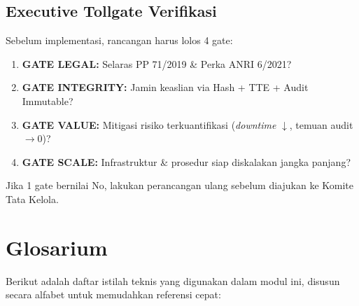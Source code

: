 \documentclass[12pt,a4paper]{report}
\begin{document}
\section{Executive Tollgate Verifikasi}
Sebelum implementasi, rancangan harus lolos 4 gate:
\begin{enumerate}[leftmargin=*]
    \item \textbf{GATE LEGAL:} Selaras PP 71/2019 \& Perka ANRI 6/2021?
    \item \textbf{GATE INTEGRITY:} Jamin keaslian via Hash + TTE + Audit Immutable?
    \item \textbf{GATE VALUE:} Mitigasi risiko terkuantifikasi (\textit{downtime} $\downarrow$, temuan audit $\rightarrow 0$)?
    \item \textbf{GATE SCALE:} Infrastruktur \& prosedur siap diskalakan jangka panjang?
\end{enumerate}
Jika 1 gate bernilai No, lakukan perancangan ulang sebelum diajukan ke Komite Tata Kelola.

\chapter*{Glosarium}

Berikut adalah daftar istilah teknis yang digunakan dalam modul ini, disusun secara alfabet untuk memudahkan referensi cepat:
\end{document}
